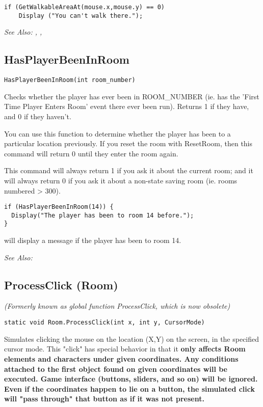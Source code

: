 \begin{verbatim}
if (GetWalkableAreaAt(mouse.x,mouse.y) == 0)
    Display ("You can't walk there.");
\end{verbatim}

\it{See Also:} ,
,


\subsection{HasPlayerBeenInRoom}\label{HasPlayerBeenInRoom}%

\begin{verbatim}
HasPlayerBeenInRoom(int room_number)
\end{verbatim}
Checks whether the player has ever been in ROOM_NUMBER (ie. has the 'First Time Player
Enters Room' event there ever been run). Returns 1 if they have, and 0 if they haven't.

You can use this function to determine whether the player has been to a particular location
previously. If you reset the room with ResetRoom, then this command will return 0 until
they enter the room again.

This command will always return 1 if you ask it about the current room; and it will always
return 0 if you ask it about a non-state saving room (ie. rooms numbered > 300).

\begin{verbatim}
if (HasPlayerBeenInRoom(14)) {
  Display("The player has been to room 14 before.");
}
\end{verbatim}
will display a message if the player has been to room 14.

\it{See Also:} 


\subsection{ProcessClick (Room)}\label{Room.ProcessClick}%

\it{(Formerly known as global function ProcessClick, which is now obsolete)}

\begin{verbatim}
static void Room.ProcessClick(int x, int y, CursorMode)
\end{verbatim}
Simulates clicking the mouse on the location (X,Y) on the screen, in the
specified cursor mode. This "click" has special behavior in that it \bf{only
affects Room elements and characters} under given coordinates. Any conditions attached
to the first object found on given coordinates will be executed. Game interface
(buttons, sliders, and so on) will be \bf{ignored}. Even if the coordinates happen
to lie on a button, the simulated click will "pass through" that button as if it
was not present.

